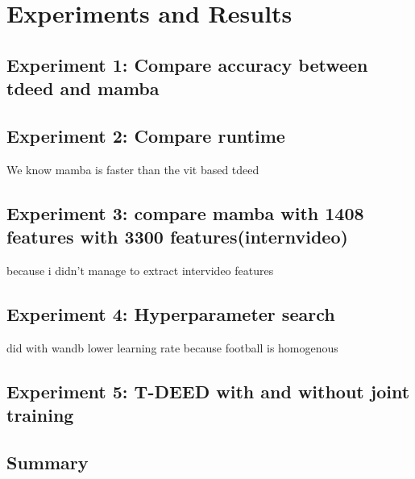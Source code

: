 \chapter{Experiments and Results}
\label{chap:experiments}

\section{Experiment 1: Compare accuracy between tdeed and mamba}
\section{Experiment 2: Compare runtime}
We know mamba is faster than the vit based tdeed
\section{Experiment 3: compare mamba with 1408 features with 3300 features(internvideo)}
because i didn't manage to extract intervideo features
\section{Experiment 4: Hyperparameter search}
did with wandb
lower learning rate because football is homogenous
\section{Experiment 5: T-DEED with and without joint training}
\section{Summary}

